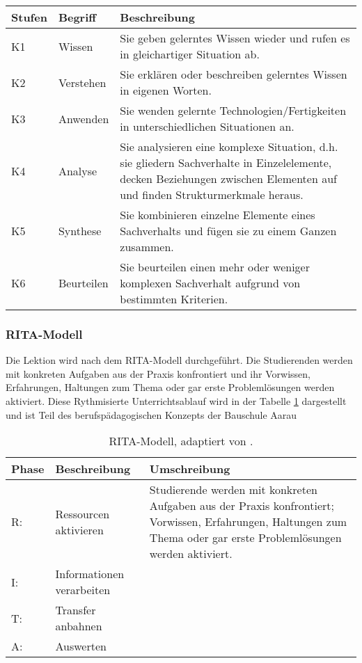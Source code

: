 \documentclass[
11pt,
captions=tableheading,
headsepline,
footsepline, 
captions=tableheading,
parskip=half-,
]{scrartcl}
\begin{document}
\begin{table}[H]
    \centering
    \label{tab:Bloom}
    \caption{Kognitive Taxonomiestufen nach Bloom \cite{bloom1956taxonomy}, adaptiert von \cite{BerufspädagogischesKonzept_BauschuleAarau}.}
    \begin{longtable}{@{}llp{12cm}@{}}
        \toprule
        \textbf{Stufen} & \textbf{Begriff} & \textbf{Beschreibung} \\ 
        \midrule
        K1 & Wissen & Sie geben gelerntes Wissen wieder und rufen es in gleichartiger Situation ab. \\ 
        K2 & Verstehen & Sie erklären oder beschreiben gelerntes Wissen in eigenen Worten. \\ 
        K3 & Anwenden & Sie wenden gelernte Technologien/Fertigkeiten in unterschiedlichen Situationen an. \\ 
        K4 & Analyse & Sie analysieren eine komplexe Situation, d.h. sie gliedern Sachverhalte in Einzelelemente, decken Beziehungen zwischen Elementen auf und finden Strukturmerkmale heraus. \\ 
        K5 & Synthese & Sie kombinieren einzelne Elemente eines Sachverhalts und fügen sie zu einem Ganzen zusammen. \\ 
        K6 & Beurteilen & Sie beurteilen einen mehr oder weniger komplexen Sachverhalt aufgrund von bestimmten Kriterien. \\ 
        \bottomrule
    \end{longtable}
\end{table}




\subsubsection{RITA-Modell}
Die Lektion wird nach dem RITA-Modell durchgeführt. 
Die Studierenden werden mit konkreten Aufgaben aus der Praxis konfrontiert und ihr Vorwissen, Erfahrungen, Haltungen zum Thema oder gar erste Problemlösungen werden aktiviert.
Diese Rythmisierte Unterrichtsablauf wird in der Tabelle \cref{tab:RITA_Modell} dargestellt und ist Teil des berufspädagogischen Konzepts der Bauschule Aarau \cite{BerufspädagogischesKonzept_BauschuleAarau}


\begin{table}[H]
    \centering
    \label{tab:RITA_Modell}
    \caption{RITA-Modell, adaptiert von \cite{BerufspädagogischesKonzept_BauschuleAarau}.}
    \begin{tabularx}{\textwidth}{@{}llp{9.5cm}@{}}
    \toprule
    \textbf{Phase} & \textbf{Beschreibung} & \textbf{Umschreibung} \\
    \midrule
    R:  & Ressourcen aktivieren & Studierende werden mit konkreten Aufgaben aus der Praxis konfrontiert; Vorwissen, Erfahrungen, Haltungen zum Thema oder gar erste Problemlösungen werden aktiviert. \\
    I: & Informationen verarbeiten & {} \\
    T: & Transfer anbahnen & {} \\
    A: & Auswerten & {} \\
    \bottomrule
    \end{tabularx}
    \end{table}
\end{document}
